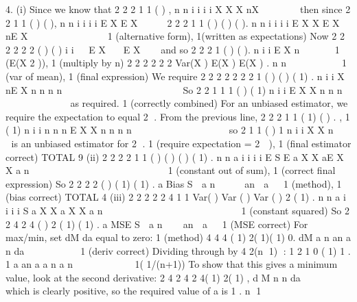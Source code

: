 4. (i) Since we know that 2 2 2
1 1
( ) ,
n n
i i
i i
X X X nX
 
    then since 2 2
1 1
( ) ( ),
n n
i i
i i
E X E X
 
 
2 2 2
1 1
( ) ( ) ( ).
n n
i i
i i
E X X E X nE X
 
 
    
 
 
1 (alternative form), 1(written as expectations)
Now 2 2 2 2 2 2 ( ) ( ) i i   E X   E X   and so 2 2 2
1
( ) ( ).
n
i
i
E X n 

  
1 (E(X 2 )), 1 (multiply by n)
2 2
2 2 2 2 Var(X ) E(X ) E(X ) .
n n
 
      1 (var of mean), 1 (final expression)
We require
2
2 2 2 2 2 2
1
( ) ( ) ( 1) .
n
i
i
X nE X n n n
n

   

 
        
 
 So
2 2
1
1 1
( ) ( 1)
n
i
i
E X X n
n n


 
    
 
 as required. 1 (correctly combined)
For an unbiased estimator, we require the expectation to equal 2 . From the previous line,
2 2 2
1
1 ( 1)
( ) . ,
1 ( 1)
n
i
i
n n n
E X X
n n n n
 

  
        
 so 2
1
1
( )
1
n
i
i
X X
n 

  is an unbiased
estimator for 2 .
1 (require expectation = 2  ), 1 (final estimator correct)
TOTAL 9
(ii) 2 2 2 2
1 1
( ) ( ) ( ) ( 1) .
n n
a i i
i i
E S E a X X aE X X a n 
 
   
         
   
 
1 (constant out of sum), 1 (correct final expression)
So 2 2 2 2 ( ) ( 1) ( 1) . a Bias S  a n     an  a   1 (method), 1 (bias correct)
TOTAL 4
(iii) 2 2 2 2 2 4
1 1
Var( ) Var ( ) Var ( ) 2 ( 1) .
n n
a i i
i i
S a X X a X X a n 
 
   
         
   
 
1 (constant squared)
So 2 2 4 2 4 ( ) 2 ( 1) ( 1) . a MSE S  a n    an  a   1 (MSE correct)
For max/min, set
dM
da
equal to zero: 1 (method)
4 4 4 ( 1) 2( 1)( 1) 0.
dM
a n an a n
da
         1 (deriv correct)
Dividing through by 4 2(n 1) :
1
2 1 0 ( 1) 1 .
1
a an a a n a
n
        

1( 1/(n+1))
To show that this gives a minimum value, look at the second derivative:
2
4 2 4
2 4( 1) 2( 1) ,
d M
n n
da
      which is clearly positive, so the required value of a is
1
.
n 1